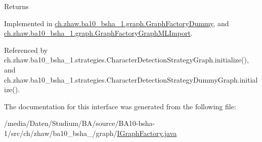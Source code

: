 \begin{DoxyReturn}{Returns}

\end{DoxyReturn}


Implemented in \hyperlink{classch_1_1zhaw_1_1ba10__bsha__1_1_1graph_1_1GraphFactoryDummy_aee963953d9d848498caf25bf30cbe8bf}{ch.zhaw.ba10\_\-bsha\_\-1.graph.GraphFactoryDummy}, and \hyperlink{classch_1_1zhaw_1_1ba10__bsha__1_1_1graph_1_1GraphFactoryGraphMLImport_a2936d100be1654461056080ff61edd32}{ch.zhaw.ba10\_\-bsha\_\-1.graph.GraphFactoryGraphMLImport}.

Referenced by ch.zhaw.ba10\_\-bsha\_\-1.strategies.CharacterDetectionStrategyGraph.initialize(), and ch.zhaw.ba10\_\-bsha\_\-1.strategies.CharacterDetectionStrategyDummyGraph.initialize().

The documentation for this interface was generated from the following file:\begin{DoxyCompactItemize}
\item 
/media/Daten/Studium/BA/source/BA10-\/bsha-\/1/src/ch/zhaw/ba10\_\-bsha\_/graph/\hyperlink{IGraphFactory_8java}{IGraphFactory.java}\end{DoxyCompactItemize}
